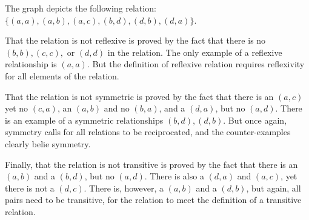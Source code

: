 The graph depicts the following relation:
$\{(a,a),(a,b),(a,c),(b,d),(d,b),(d,a)\}$.

That the relation is not reflexive is proved by the fact that there is no
$(b,b), (c,c),$ or $(d,d)$ in the relation. The only example of a reflexive
relationship is $(a,a)$. But the definition of reflexive relation requires
reflexivity for all elements of the relation.

That the relation is not symmetric is proved by the fact that there is an
$(a,c)$ yet no $(c,a)$, an $(a,b)$ and no $(b,a)$, and a $(d,a)$, but no
$(a,d)$. There is an example of a symmetric relationships $(b,d),(d,b)$. But
once again, symmetry calls for all relations to be reciprocated, and the
counter-examples clearly belie symmetry.

Finally, that the relation is not transitive is proved by the fact that
there is an $(a,b)$ and a $(b,d)$, but no $(a,d)$. There is also a $(d,a)$
and $(a,c)$, yet there is not a $(d,c)$. There is, however, a $(a,b)$ and a
$(d,b)$, but again, all pairs need to be transitive, for the relation to meet
the definition of a transitive relation.
